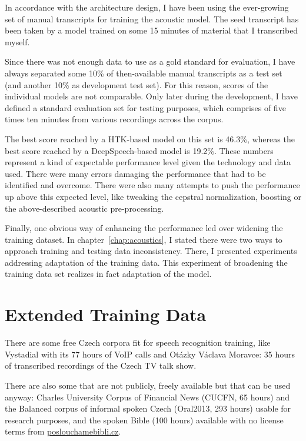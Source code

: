 \documentclass[12pt,a4paper]{report}
\begin{document}
In accordance with the architecture design, I have been using the ever-growing
set of manual transcripts for training the acoustic model. The seed transcript
has been taken by a model trained on some 15 minutes of material that I
transcribed myself.

Since there was not enough data to use as a gold standard for evaluation, I have
always separated some 10\% of then-available manual transcripts as a test set
(and another 10\% as development test set). For this reason, scores of the
individual models are not comparable. Only later during the development, I have
defined a standard evaluation set for testing purposes, which comprises of five
times ten minutes from various recordings across the corpus.

The best score reached by a HTK-based model on this set is 46.3\%, whereas the
best score reached by a DeepSpeech-based model is 19.2\%. These numbers
represent a kind of expectable performance level given the technology and data
used. There were many errors damaging the performance that had to be identified
and overcome. There were also many attempts to push the performance up above
this expected level, like tweaking the cepstral normalization, boosting or the
above-described acoustic pre-processing.

Finally, one obvious way of enhancing the performance led over widening the
training dataset. In chapter~\ref{chap:acoustics}, I stated there were two ways
to approach training and testing data inconsistency. There, I presented
experiments addressing adaptation of the training data. This experiment of
broadening the training data set realizes in fact adaptation of the model.

\section{Extended Training Data}
\label{sec:svolocz:svolocz}

There are some free Czech corpora fit for speech recognition training, like
Vystadial\cite{vystadialarticle} with its 77 hours of VoIP calls
and Otázky Václava Moravce: 35 hours of transcribed recordings of the
Czech TV talk show\cite{ovmdata}.

There are also some that are not publicly, freely available but that can be used
anyway: Charles University
Corpus of Financial News (CUCFN, 65 hours)\cite{byrne1999large} and the Balanced
corpus of informal spoken Czech (Oral2013, 293 hours)\cite{oral2013} usable for
research purposes, and the spoken Bible (100 hours) available with no license
terms from \url{poslouchamebibli.cz}.
\end{document}

